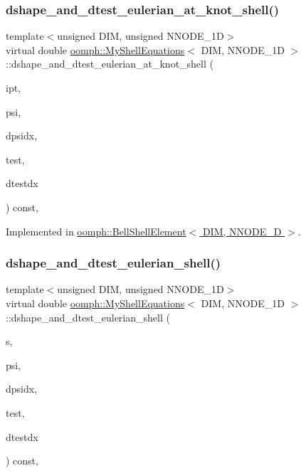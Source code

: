 \subsubsection{\texorpdfstring{dshape\+\_\+and\+\_\+dtest\+\_\+eulerian\+\_\+at\+\_\+knot\+\_\+shell()}{dshape\_and\_dtest\_eulerian\_at\_knot\_shell()}}
{\footnotesize\ttfamily template$<$unsigned D\+IM, unsigned N\+N\+O\+D\+E\+\_\+1D$>$ \\
virtual double \hyperlink{classoomph_1_1MyShellEquations}{oomph\+::\+My\+Shell\+Equations}$<$ D\+IM, N\+N\+O\+D\+E\+\_\+1D $>$\+::dshape\+\_\+and\+\_\+dtest\+\_\+eulerian\+\_\+at\+\_\+knot\+\_\+shell (\begin{DoxyParamCaption}\item[{const unsigned \&}]{ipt,  }\item[{Shape \&}]{psi,  }\item[{D\+Shape \&}]{dpsidx,  }\item[{Shape \&}]{test,  }\item[{D\+Shape \&}]{dtestdx }\end{DoxyParamCaption}) const\hspace{0.3cm}{\ttfamily [protected]}, {}}



Implemented in \hyperlink{classoomph_1_1BellShellElement_a56fcbf1446e8797e3066c802140d5baf}{oomph\+::\+Bell\+Shell\+Element$<$ D\+I\+M, N\+N\+O\+D\+E\+\_\+D $>$}.

\mbox{\label{classoomph_1_1MyShellEquations_ac0cb5a90f9eceb2406c21c1e1dc662e7}} 
\subsubsection{\texorpdfstring{dshape\+\_\+and\+\_\+dtest\+\_\+eulerian\+\_\+shell()}{dshape\_and\_dtest\_eulerian\_shell()}}
{\footnotesize\ttfamily template$<$unsigned D\+IM, unsigned N\+N\+O\+D\+E\+\_\+1D$>$ \\
virtual double \hyperlink{classoomph_1_1MyShellEquations}{oomph\+::\+My\+Shell\+Equations}$<$ D\+IM, N\+N\+O\+D\+E\+\_\+1D $>$\+::dshape\+\_\+and\+\_\+dtest\+\_\+eulerian\+\_\+shell (\begin{DoxyParamCaption}\item[{const Vector$<$ double $>$ \&}]{s,  }\item[{Shape \&}]{psi,  }\item[{D\+Shape \&}]{dpsidx,  }\item[{Shape \&}]{test,  }\item[{D\+Shape \&}]{dtestdx }\end{DoxyParamCaption}) const\hspace{0.3cm}{\ttfamily [protected]}, {}}



